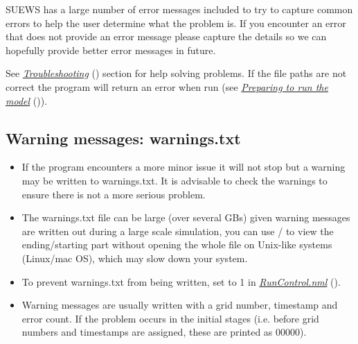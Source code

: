 \documentclass[letterpaper,10pt,english]{sphinxmanual}
\begin{document}
SUEWS has a large number of error messages included to try to capture
common errors to help the user determine what the problem is. If you
encounter an error that does not provide an error message please capture
the details so we can hopefully provide better error messages in future.

See {\hyperref[\detokenize{output_files/output_files:Troubleshooting}]{\emph{Troubleshooting}}} () section for help solving
problems. If the file paths are not correct the program will return an
error when run (see {\hyperref[\detokenize{output_files/output_files:Preparing_to_run_the_model}]{\emph{Preparing to run the
model}}} ()).


\subsection{Warning messages: warnings.txt}
\label{\detokenize{output_files/output_files:warning-messages-warnings-txt}}\begin{itemize}
\item {} 
If the program encounters a more minor issue it will not stop but a
warning may be written to warnings.txt. It is advisable to check the
warnings to ensure there is not a more serious problem.

\item {} 
The warnings.txt file can be large (over several GBs) given warning
messages are written out during a large scale simulation, you can use
/ to view the ending/starting part without opening
the whole file on Unix-like systems (Linux/mac OS), which may slow
down your system.

\item {} 
To prevent warnings.txt from being written, set 
to 1 in {\hyperref[\detokenize{output_files/output_files:RunControl.nml}]{\emph{RunControl.nml}}} ().

\item {} 
Warning messages are usually written with a grid number, timestamp
and error count. If the problem occurs in the initial stages (i.e.
before grid numbers and timestamps are assigned, these are printed as
00000).

\end{itemize}
\end{document}

